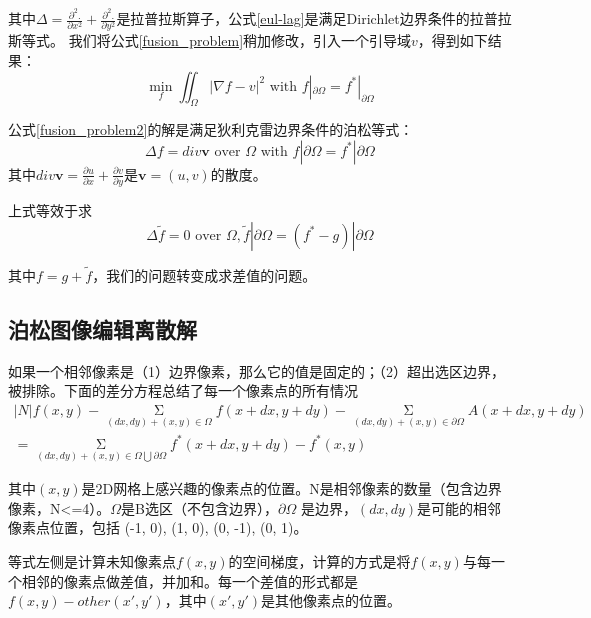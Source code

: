 其中\(\Delta = \frac{\partial^2.}{\partial{x^2}}+\frac{\partial^2.}{\partial{y^2}}\)是拉普拉斯算子，公式\eqref{eul-lag}是满足Dirichlet边界条件的拉普拉斯等式。
我们将公式\eqref{fusion_problem}稍加修改，引入一个引导域\(v\)，得到如下结果：
\begin{equation}
\mathop {min}\limits_{f}\iint_{\Omega}^{} |\nabla{f} - v|^2\text{ with }f|_{\partial\Omega} = f^*|_{\partial\Omega}
\label{fusion_problem2}
\end{equation}

公式\eqref{fusion_problem2}的解是满足狄利克雷边界条件的泊松等式：
\begin{equation}
\Delta f = div\mathbf{v}\text{ over }\Omega\text{ with }f|\partial{\Omega} = f^*|\partial{\Omega}
\label{poi_equ}
\end{equation}
其中\(div\mathbf{v} = \frac{\partial u}{\partial x}+\frac{\partial v}{\partial y}\)是\(\mathbf{v} = (u,v)\)的散度。

上式等效于求
\begin{equation}
\Delta \tilde{f} = 0\text{ over }\Omega,\tilde{f}|\partial{\Omega} = (f^* - g)|\partial{\Omega}
\label{poi_equ}
\end{equation}

其中\(f = g + \tilde{f}\)，我们的问题转变成求差值的问题。

\subsection{泊松图像编辑离散解}
如果一个相邻像素是（1）边界像素，那么它的值是固定的；（2）超出选区边界，被排除。下面的差分方程总结了每一个像素点的所有情况
\begin{equation}
\begin{aligned}
|N|f(x,y) - \mathop {\Sigma }\limits_{(dx,dy)+(x,y) \in{\Omega}}f(x+dx,y+dy)
-\mathop {\Sigma }\limits_{(dx,dy)+(x,y) \in{\partial{\Omega}}}A(x+dx,y+dy) \\
= \mathop {\Sigma }\limits_{(dx,dy)+(x,y) \in{\Omega \bigcup {\partial{\Omega}}}}
f^*(x+dx,y+dy) - f^*(x,y)
\end{aligned}
\end{equation}

其中\((x,y)\)是2D网格上感兴趣的像素点的位置。N是相邻像素的数量（包含边界像素，N<=4）。\(\Omega\)是B选区（不包含边界），\(\partial \Omega\) 是边界，\((dx, dy)\)是可能的相邻像素点位置，包括 {(-1, 0), (1, 0), (0, -1), (0, 1)}。

等式左侧是计算未知像素点\(f(x, y)\)的空间梯度，计算的方式是将\(f(x,y)\)与每一个相邻的像素点做差值，并加和。每一个差值的形式都是\(f(x,y) - other(x',y')\)，其中\((x',y')\)是其他像素点的位置。


